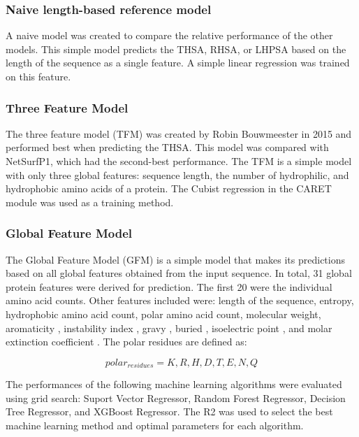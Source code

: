 \documentclass[11pt,a4paper]{article}
\begin{document}
\subsubsection{Naive length-based reference model}
A naive model was created to compare the relative performance of the other models. This simple model predicts the THSA, RHSA, or LHPSA based on the length of the sequence as a single feature. A simple linear regression was trained on this feature.

\subsubsection{Three Feature Model}
The three feature model (TFM) was created by Robin Bouwmeester in 2015 and performed best when predicting the THSA. This model was compared with NetSurfP1, which had the second-best performance. The TFM is a simple model with only three global features: sequence length, the number of hydrophilic, and hydrophobic amino acids of a protein. The Cubist regression in the CARET module was used as a training method.

\subsubsection{Global Feature Model}
The Global Feature Model (GFM) is a simple model that makes its predictions based on all global features obtained from the input sequence. In total, 31 global protein features were derived for prediction. The first 20 were the individual amino acid counts. Other features included were: length of the sequence, entropy,  hydrophobic amino acid count, polar amino acid count, molecular weight, aromaticity \cite{lobry1994hydrophobicity}, instability index \cite{guruprasad1990correlation}, gravy \cite{kyte1982simple}, buried \cite{rose1985hydrophobicity}, isoelectric point \cite{bjellqvist1993focusing}, and molar extinction coefficient \cite{gill1989calculation}. The polar residues are defined as:

\begin{equation}
polar_{residues} = {K, R, H, D, T, E, N, Q} 
\end{equation}

The performances of the following machine learning algorithms were evaluated using grid search: Suport Vector Regressor, Random Forest Regressor, Decision Tree Regressor, and XGBoost Regressor. The R2 was used to select the best machine learning method and optimal parameters for each algorithm.
\end{document}
